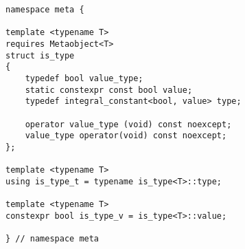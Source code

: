 
\begin{verbatim}
namespace meta {

template <typename T>
requires Metaobject<T>
struct is_type
{
	typedef bool value_type;
	static constexpr const bool value;
	typedef integral_constant<bool, value> type;

	operator value_type (void) const noexcept;
	value_type operator(void) const noexcept;
};

template <typename T>
using is_type_t = typename is_type<T>::type;

template <typename T>
constexpr bool is_type_v = is_type<T>::value;

} // namespace meta
\end{verbatim}
